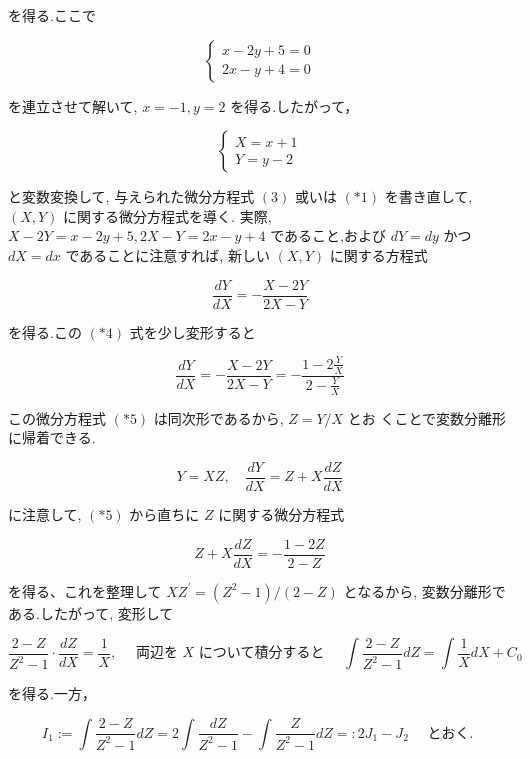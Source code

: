 \documentclass[10pt]{jsarticle}
\begin{document}
を得る.ここで

\[
\left\{\begin{array}{l}
x-2 y+5=0  \tag{*2}\\
2 x-y+4=0
\end{array}\right.
\]

を連立させて解いて, $x=-1, y=2$ を得る.したがって，

\[
\left\{\begin{array}{l}
X=x+1  \tag{*3}\\
Y=y-2
\end{array}\right.
\]

と変数変換して, 与えられた微分方程式 $(3)$ 或いは $(* 1)$ を書き直して, $(X, Y)$ に関する微分方程式を導く. 実際, $X-2 Y=x-2 y+5,2 X-Y=2 x-y+4$ であること,および $d Y=d y$ かつ $d X=d x$ であることに注意すれば, 新しい $(X, Y)$ に関する方程式


\begin{equation*}
\frac{d Y}{d X}=-\frac{X-2 Y}{2 X-Y} \tag{*4}
\end{equation*}


を得る.この $(* 4)$ 式を少し変形すると


\begin{equation*}
\frac{d Y}{d X}=-\frac{X-2 Y}{2 X-Y}=-\frac{1-2 \frac{Y}{X}}{2-\frac{Y}{X}} \tag{*5}
\end{equation*}

この微分方程式 $(* 5)$ は同次形であるから, $Z=Y / X$ とお くことで変数分離形に帰着できる.

$$
Y=X Z, \quad \frac{d Y}{d X}=Z+X \frac{d Z}{d X}
$$

に注意して, $(* 5)$ から直ちに $Z$ に関する微分方程式


\begin{equation*}
Z+X \frac{d Z}{d X}=-\frac{1-2 Z}{2-Z} \tag{*6}
\end{equation*}


を得る、これを整理して $X Z^{\prime}=\left(Z^{2}-1\right) /(2-Z)$ となるから, 変数分離形である.したがって, 変形して


\begin{equation*}
\frac{2-Z}{Z^{2}-1} \cdot \frac{d Z}{d X}=\frac{1}{X}, \quad \text { 両辺を } X \text { について積分すると } \quad \int \frac{2-Z}{Z^{2}-1} d Z=\int \frac{1}{X} d X+C_{0} \tag{*7}
\end{equation*}


を得る.一方，


\begin{equation*}
I_{1}:=\int \frac{2-Z}{Z^{2}-1} d Z=2 \int \frac{d Z}{Z^{2}-1}-\int \frac{Z}{Z^{2}-1} d Z=: 2 J_{1}-J_{2} \quad \text { とおく. } \tag{*8}
\end{equation*}
\end{document}
